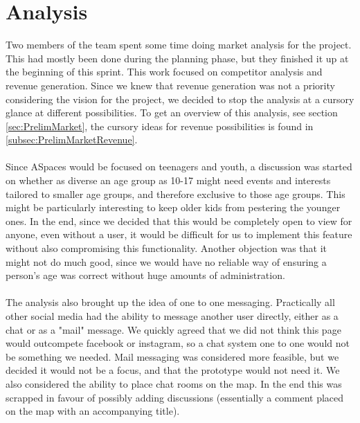 \section{Analysis}
\label{sec:S1Analysis}
Two members of the team spent some time doing market analysis for the project. This had mostly been done during the planning phase, but they finished it up at the beginning of this sprint. This work focused on competitor analysis and revenue generation. Since we knew that revenue generation was not a priority considering the vision for the project, we decided to stop the analysis at a cursory glance at different possibilities. To get an overview of this analysis, see section \ref{sec:PrelimMarket}, the cursory ideas for revenue possibilities is found in \ref{subsec:PrelimMarketRevenue}.

\paragraph{} Since ASpaces would be focused on teenagers and youth, a discussion was started on whether as diverse an age group as 10-17 might need events and interests tailored to smaller age groups, and therefore exclusive to those age groups. This might be particularly interesting to keep older kids from pestering the younger ones. In the end, since we decided that this would be completely open to view for anyone, even without a user, it would be difficult for us to implement this feature without also compromising this functionality. Another objection was that it might not do much good, since we would have no reliable way of ensuring a person's age was correct without huge amounts of administration.

\paragraph{} The analysis also brought up the idea of one to one messaging. Practically all other social media had the ability to message another user directly, either as a chat or as a "mail" message. We quickly agreed that we did not think this page would outcompete facebook or instagram, so a chat system one to one would not be something we needed. Mail messaging was considered more feasible, but we decided it would not be a focus, and that the prototype would not need it. We also considered the ability to place chat rooms on the map. In the end this was scrapped in favour of possibly adding discussions (essentially a comment placed on the map with an accompanying title).

